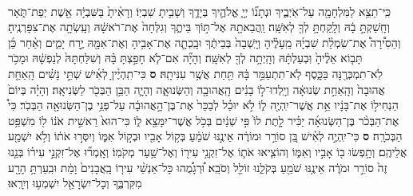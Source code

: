 \documentclass[twoside, openany, parskip=half, 11pt]{book}
\begin{document}
\begin{footnotesize}
\begin{multicols}{2}
\\
 כִּֽי־תֵצֵ֥א לַמִּלְחָמָ֖ה עַל־אֹֽיְבֶ֑יךָ וּנְתָנ֞וֹ יְיָ֧ אֱלֹהֶ֛יךָ בְּיָדֶ֖ךָ וְשָׁבִ֥יתָ שִׁבְיֽוֹ׃ וְרָאִ֨יתָ֙ בַּשִּׁבְיָ֔ה אֵ֖שֶׁת יְפַת־תֹּ֑אַר וְחָֽשַׁקְתָּ֣ בָ֔הּ וְלָֽקַחְתָּ֥ לְךָ֖ לְאִשָּֽׁה׃ וַֽהֲבֵאתָ֖הּ אֶל־תּ֣וֹךְ בֵּיתֶ֑ךָ וְגִלְּחָה֙ אֶת־רֹאשָׁ֔הּ וְעָֽשְׂתָ֖ה אֶת־צִפָּרְנֶֽיהָ׃ וְהֵסִ֩ירָה֩ אֶת־שִׂמְלַ֨ת שִׁבְיָ֜הּ מֵֽעָלֶ֗יהָ וְיָֽשְׁבָה֙ בְּבֵיתֶ֔ךָ וּבָֽכְתָ֛ה אֶת־אָבִ֥יהָ וְאֶת־אִמָּ֖הּ יֶ֣רַח יָמִ֑ים וְאַ֨חַר כֵּ֜ן תָּב֤וֹא אֵלֶ֨יהָ֙ וּֽבְעַלְתָּ֔הּ וְהָֽיְתָ֥ה לְךָ֖ לְאִשָּֽׁה׃ וְהָיָ֞ה אִם־לֹ֧א חָפַ֣צְתָּ בָּ֗הּ וְשִׁלַּחְתָּהּ֙ לְנַפְשָׁ֔הּ וּמָכֹ֥ר לֹֽא־תִמְכְּרֶ֖נָּה בַּכָּ֑סֶף לֹֽא־תִתְעַמֵּ֣ר בָּ֔הּ תַּ֖חַת אֲשֶׁ֥ר עִנִּיתָֽהּ׃ \textbf{ס} 
 כִּי־תִֽהְיֶ֨יןָ לְאִ֜ישׁ שְׁתֵּ֣י נָשִׁ֗ים הָֽאַחַ֤ת אֲהוּבָה֙ וְהָֽאַחַ֣ת שְׂנוּאָ֔ה וְיָֽלְדוּ־ל֣וֹ בָנִ֔ים הָֽאֲהוּבָ֖ה וְהַשְּׂנוּאָ֑ה וְהָיָ֛ה הַבֵּ֥ן הַבְּכֹ֖ר לַשְּׂנִיאָֽה׃ וְהָיָ֗ה בְּיוֹם֙ הַנְחִיל֣וֹ אֶת־בָּנָ֔יו אֵ֥ת אֲשֶׁר־יִֽהְיֶ֖ה ל֑וֹ לֹ֣א יוּכַ֗ל לְבַכֵּר֙ אֶת־בֶּן־הָ֣אֲהוּבָ֔ה עַל־פְּנֵ֥י בֶן־הַשְּׂנוּאָ֖ה הַבְּכֹֽר׃ כִּי֩ אֶת־הַבְּכֹ֨ר בֶּן־הַשְּׂנוּאָ֜ה יַכִּ֗יר לָ֤תֶת לוֹ֙ פִּ֣י שְׁנַ֔יִם בְּכֹ֥ל אֲשֶׁר־יִמָּצֵ֖א ל֑וֹ כִּי־הוּא֙ רֵאשִׁ֣ית אֹנ֔וֹ ל֖וֹ מִשְׁפַּ֥ט הַבְּכֹרָֽה׃ \textbf{ס} 
כִּי־יִֽהְיֶ֣ה לְאִ֗ישׁ בֵּ֚ן סוֹרֵ֣ר וּמוֹרֶ֔ה אֵינֶ֣נּוּ שֹׁמֵ֔עַ בְּק֥וֹל אָבִ֖יו וּבְק֣וֹל אִמּ֑וֹ וְיִסְּר֣וּ אֹת֔וֹ וְלֹ֥א יִשְׁמַ֖ע אֲלֵיהֶֽם׃ וְתָ֥פְשׂוּ ב֖וֹ אָבִ֣יו וְאִמּ֑וֹ וְהוֹצִ֧יאוּ אֹת֛וֹ אֶל־זִקְנֵ֥י עִיר֖וֹ וְאֶל־שַׁ֥עַר מְקֹמֽוֹ׃ וְאָֽמְר֞וּ אֶל־זִקְנֵ֣י עִיר֗וֹ בְּנֵ֤נוּ זֶה֙ סוֹרֵ֣ר וּמֹרֶ֔ה אֵינֶ֥נּוּ שֹׁמֵ֖עַ בְּקֹלֵ֑נוּ זוֹלֵ֖ל וְסֹבֵֽא׃ וּ֠רְגָמֻ֠הוּ כָּל־אַנְשֵׁ֨י עִיר֤וֹ בָֽאֲבָנִים֙ וָמֵ֔ת וּבִֽעַרְתָּ֥ הָרָ֖ע מִקִּרְבֶּ֑ךָ וְכָל־יִשְׂרָאֵ֖ל יִשְׁמְע֥וּ וְיִרָֽאוּ׃


\end{multicols}
\end{footnotesize}
\end{document}
